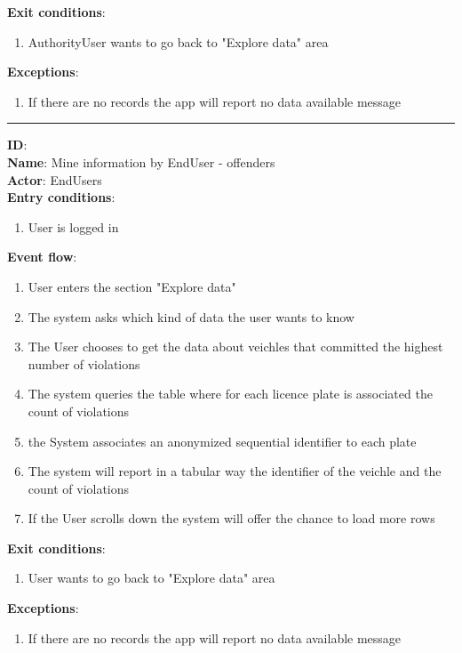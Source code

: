 	\textbf{Exit conditions}:
  \begin{enumerate}
    \item{AuthorityUser wants to go back to "Explore data" area}
  \end{enumerate}
	\textbf{Exceptions}:
	\begin{enumerate}
		\item{If there are no records the app will report no data available message}
	\end{enumerate}
	\rule{\linewidth}{0.4pt}
  \textbf{ID}:  \\
  \textbf{Name}: Mine information by EndUser - offenders \\
  \textbf{Actor}: EndUsers   \\
  \textbf{Entry conditions}:
  \begin{enumerate}
    \item{User is logged in}
  \end{enumerate}
  \textbf{Event flow}:
  \begin{enumerate}
    \item{User enters the section "Explore data"}
    \item{The system asks which kind of data the user wants to know}
    \item{The User chooses to get the data about veichles that committed the highest number of violations}
    \item{The system queries the table where for each licence plate is associated the count of violations }
    \item{the System associates an anonymized sequential identifier to each plate}
    \item{The system will report in a tabular way the identifier of the veichle and the count of violations}
    \item{If the User scrolls down the system will offer the chance to load more rows}
  \end{enumerate}
  \textbf{Exit conditions}:
  \begin{enumerate}
    \item{User wants to go back to "Explore data" area}
  \end{enumerate}
  \textbf{Exceptions}:
  \begin{enumerate}
    \item{If there are no records the app will report no data available message}
  \end{enumerate}
